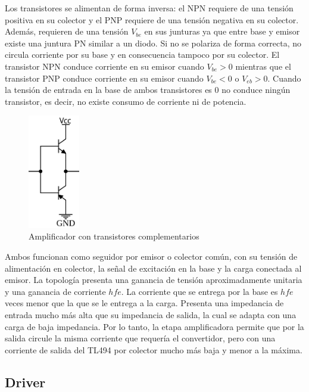 Los transistores se alimentan de forma inversa: el NPN requiere de una tensión positiva en su colector y el PNP requiere de una tensión negativa en su colector.
Además, requieren de una tensión $V_{be}$ en sus junturas ya que entre base y emisor existe una juntura PN similar a un diodo. 
Si no se polariza de forma correcta, no circula corriente por su base y en consecuencia tampoco por su colector. 
El transistor NPN conduce corriente en su emisor cuando $V_{be}>0$ mientras que el transistor PNP conduce corriente en su emisor cuando $V_{be}<0$ o $V_{eb}>0$.
Cuando la tensión de entrada en la base de ambos transistores es 0 no conduce ningún transistor, es decir, no existe consumo de corriente ni de potencia. 

\begin{figure}[H]
    \centering
    \includegraphics[width=0.2\textwidth]{images/clase-b.png}
    \caption{Amplificador con transistores complementarios}
    \label{fig:complementarios}
\end{figure}

Ambos funcionan como seguidor por emisor o colector común, con su tensión de alimentación en colector, la señal de excitación en la base y la carga conectada al emisor. 
La topología presenta una ganancia de tensión aproximadamente unitaria y una ganancia de corriente $hfe$. 
La corriente que se entrega por la base es $hfe$ veces menor que la que se le entrega a la carga. 
Presenta una impedancia de entrada mucho más alta que su impedancia de salida, la cual se adapta con una carga de baja impedancia. 
Por lo tanto, la etapa amplificadora permite que por la salida circule la misma corriente que requería el convertidor, pero con una corriente de salida del TL494 por colector mucho más baja y menor a la máxima. 

\subsection{Driver}

